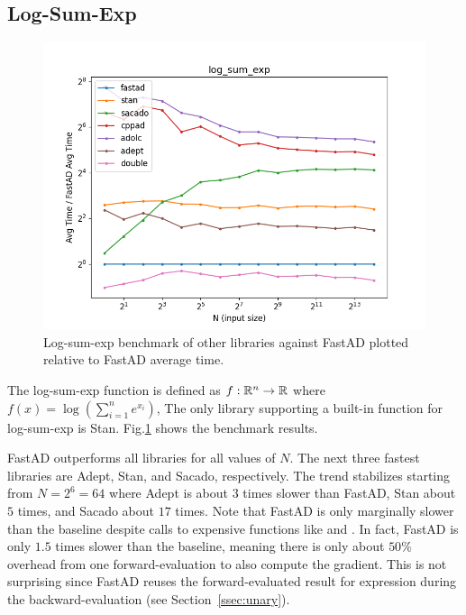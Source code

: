 \subsection{Log-Sum-Exp}

\begin{figure}[t]
    \centering
    \includegraphics[width=\textwidth]{figs/log_sum_exp_fig.png}
    \caption{%
        Log-sum-exp benchmark of other libraries against FastAD 
        plotted relative to FastAD average time.
    }\label{fig:log_sum_exp}
\end{figure}

The log-sum-exp function is defined as $f:\mathbb{R}^n \to \mathbb{R}$ 
where~$f(x) = \log(\sum\limits_{i=1}^n e^{x_i})$,
The only library supporting a built-in function for log-sum-exp is Stan.
Fig.\ref{fig:log_sum_exp} shows the benchmark results.

FastAD outperforms all libraries for all values of $N$.
The next three fastest libraries are Adept, Stan, and Sacado, respectively.
The trend stabilizes starting from $N=2^6=64$ where 
Adept is about $ 3$ times slower than FastAD, 
Stan about $ 5$ times, and 
Sacado about $ 17$ times.
Note that FastAD is only marginally slower than the baseline
despite calls to expensive functions like  and .
In fact, FastAD is only $ 1.5$ times slower than the baseline, 
meaning there is only about $ 50\%$
overhead from one forward-evaluation to also compute the gradient.
This is not surprising since FastAD reuses
the forward-evaluated result for  expression
during the backward-evaluation (see Section~\ref{ssec:unary}).
